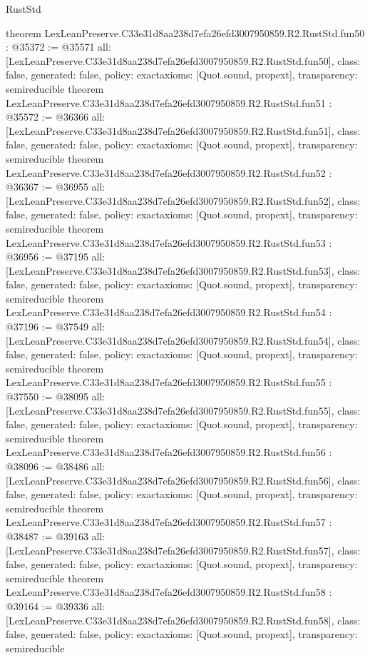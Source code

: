 \begin{lexlean}{RustStd}
\begin{coremodule}
{}
theorem LexLeanPreserve.C33e31d8aa238d7efa26efd3007950859.R2.RustStd.fun50 : @35372 := @35571 {
  all: [LexLeanPreserve.C33e31d8aa238d7efa26efd3007950859.R2.RustStd.fun50],
  class: false,
  generated: false,
  policy: exact{axioms: [Quot.sound, propext]},
  transparency: semireducible
}
theorem LexLeanPreserve.C33e31d8aa238d7efa26efd3007950859.R2.RustStd.fun51 : @35572 := @36366 {
  all: [LexLeanPreserve.C33e31d8aa238d7efa26efd3007950859.R2.RustStd.fun51],
  class: false,
  generated: false,
  policy: exact{axioms: [Quot.sound, propext]},
  transparency: semireducible
}
theorem LexLeanPreserve.C33e31d8aa238d7efa26efd3007950859.R2.RustStd.fun52 : @36367 := @36955 {
  all: [LexLeanPreserve.C33e31d8aa238d7efa26efd3007950859.R2.RustStd.fun52],
  class: false,
  generated: false,
  policy: exact{axioms: [Quot.sound, propext]},
  transparency: semireducible
}
theorem LexLeanPreserve.C33e31d8aa238d7efa26efd3007950859.R2.RustStd.fun53 : @36956 := @37195 {
  all: [LexLeanPreserve.C33e31d8aa238d7efa26efd3007950859.R2.RustStd.fun53],
  class: false,
  generated: false,
  policy: exact{axioms: [Quot.sound, propext]},
  transparency: semireducible
}
theorem LexLeanPreserve.C33e31d8aa238d7efa26efd3007950859.R2.RustStd.fun54 : @37196 := @37549 {
  all: [LexLeanPreserve.C33e31d8aa238d7efa26efd3007950859.R2.RustStd.fun54],
  class: false,
  generated: false,
  policy: exact{axioms: [Quot.sound, propext]},
  transparency: semireducible
}
theorem LexLeanPreserve.C33e31d8aa238d7efa26efd3007950859.R2.RustStd.fun55 : @37550 := @38095 {
  all: [LexLeanPreserve.C33e31d8aa238d7efa26efd3007950859.R2.RustStd.fun55],
  class: false,
  generated: false,
  policy: exact{axioms: [Quot.sound, propext]},
  transparency: semireducible
}
theorem LexLeanPreserve.C33e31d8aa238d7efa26efd3007950859.R2.RustStd.fun56 : @38096 := @38486 {
  all: [LexLeanPreserve.C33e31d8aa238d7efa26efd3007950859.R2.RustStd.fun56],
  class: false,
  generated: false,
  policy: exact{axioms: [Quot.sound, propext]},
  transparency: semireducible
}
theorem LexLeanPreserve.C33e31d8aa238d7efa26efd3007950859.R2.RustStd.fun57 : @38487 := @39163 {
  all: [LexLeanPreserve.C33e31d8aa238d7efa26efd3007950859.R2.RustStd.fun57],
  class: false,
  generated: false,
  policy: exact{axioms: [Quot.sound, propext]},
  transparency: semireducible
}
theorem LexLeanPreserve.C33e31d8aa238d7efa26efd3007950859.R2.RustStd.fun58 : @39164 := @39336 {
  all: [LexLeanPreserve.C33e31d8aa238d7efa26efd3007950859.R2.RustStd.fun58],
  class: false,
  generated: false,
  policy: exact{axioms: [Quot.sound, propext]},
  transparency: semireducible
}
\end{coremodule}
\end{lexlean}
